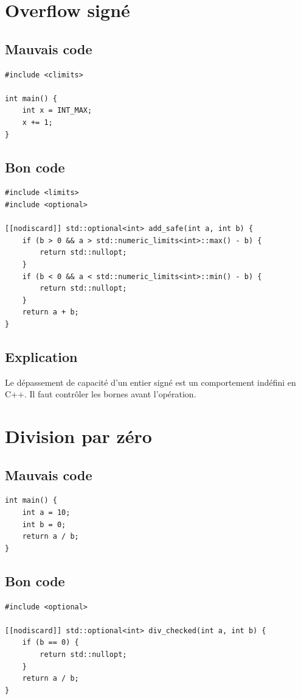 \documentclass[a4paper,11pt]{report}
\begin{document}
\chapter{Overflow signé}

\section{Mauvais code}
\begin{lstlisting}
#include <climits>

int main() {
    int x = INT_MAX;
    x += 1;
}
\end{lstlisting}

\section{Bon code}
\begin{lstlisting}
#include <limits>
#include <optional>

[[nodiscard]] std::optional<int> add_safe(int a, int b) {
    if (b > 0 && a > std::numeric_limits<int>::max() - b) {
        return std::nullopt;
    }
    if (b < 0 && a < std::numeric_limits<int>::min() - b) {
        return std::nullopt;
    }
    return a + b;
}
\end{lstlisting}

\section{Explication}
Le dépassement de capacité d'un entier signé est un comportement indéfini en C++.
Il faut contrôler les bornes avant l'opération.

\chapter{Division par zéro}

\section{Mauvais code}
\begin{lstlisting}
int main() {
    int a = 10;
    int b = 0;
    return a / b;
}
\end{lstlisting}

\section{Bon code}
\begin{lstlisting}
#include <optional>

[[nodiscard]] std::optional<int> div_checked(int a, int b) {
    if (b == 0) {
        return std::nullopt;
    }
    return a / b;
}
\end{lstlisting}
\end{document}
